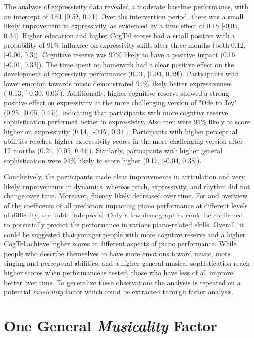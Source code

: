 The analysis of expressivity data revealed a moderate baseline performance, with an intercept of 0.61 [0.52, 0.71]. Over the intervention period, there was a small likely improvement in expressivity, as evidenced by a time effect of 0.15 [-0.05, 0.34].
Higher education and higher CogTel scores had a small positive with a probability of 91\% influence on expressivity skills after three months (both 0.12, [-0.06, 0.3]). Cognitive reserve was 97\% likely to have a positive impact (0.16, [-0.01, 0.33]).
The time spent on homework had a clear positive effect on the development of expressivity performance (0.21, [0.04, 0.39]).
Participants with lower emotion towards music demonstrated 94\% likely better expressiveness (-0.13, [-0.30, 0.03]).
Additionally, higher cognitive reserve showed a strong positive effect on expressivity at the more challenging version of "Ode to Joy" (0.25, [0.05, 0.45]), indicating that participants with more cogntive reserve sophistication performed better in expressivity. Also men were 91\% likely to score higher on expressivity (0.14, [-0.07, 0.34]). Partcipants with higher perceptual abilities reached higher expressivity scores in the more challenging version after 12 months (0.24, [0.05, 0.44]). Similarly, participants with higher general sophistication were 94\% likely to score higher (0.17, [-0.04, 0.38]).


Conclusively, the participants made clear improvements in articulation and very likely improvements in dynamics, whereas pitch, expressivity, and rhythm did not change over time. Moreover, fluency likely decreased over time. For and overview of the coefficents of all predictors impacting piano performance at different levels of difficulty, see Table \ref{tab:preds}. Only a few demographics could be confirmed to potentially predict the performance in various piano-related skills. Overall, it could be suggested that younger people with more cogntive reserve and a higher CogTel achieve higher scores in different aspects of piano performance. While people who describe themselves to have more emotions toward music, more singing and perceptual abilities, and a higher general musical sophistication reach higher scores when performance is tested, those who have less of all improve better over time. To generalize these observations the analysis is repeated on a potential \textit{musicality} factor which could be extracted through factor analysis. 

\section{One General \textit{Musicality} Factor}

